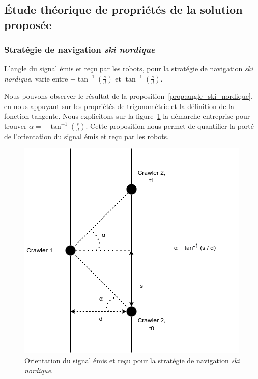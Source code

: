 \documentclass[francais,RandD]{rapportPFE}
\begin{document}
		\subsection{Étude théorique de propriétés de la solution proposée}
			\subsubsection*{Stratégie de navigation \textit{ski nordique}}
				\begin{Proposition}
					L'angle du signal émis et reçu par les robots, pour la stratégie de navigation \textit{ski nordique}, varie entre $-\tan^{-1}(\frac{s}{d})$ et $\tan^{-1}(\frac{s}{d})$.
					\label{prop:angle_ski_nordique}
				\end{Proposition}

				Nous pouvons observer le résultat de la proposition~\ref{prop:angle_ski_nordique}, en nous appuyant sur les propriétés de trigonométrie et la définition de la fonction tangente.
				Nous explicitons sur la figure~\ref{fig:angle_ski_nordique} la démarche entreprise pour trouver $\alpha = -\tan^{-1}(\frac{s}{d})$.
				Cette proposition nous permet de quantifier la porté de l'orientation du signal émis et reçu par les robots.

				\begin{figure}[h!]
					\centering
					\includegraphics[scale=0.5]{graphics/angle_ski_nordique.png}
					\caption{Orientation du signal émis et reçu pour la stratégie de navigation \textit{ski nordique}.}
					\label{fig:angle_ski_nordique}
				\end{figure}
\end{document}
